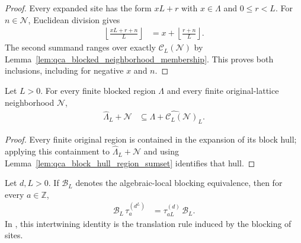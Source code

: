 \begin{proof}\leanok
    Every expanded site has the form $xL+r$ with $x\in\Lambda$ and $0\leq r<L$.
    For $n\in\mathcal N$, Euclidean division gives
    \begin{align}
        \left\lfloor\frac{xL+r+n}{L}\right\rfloor
         & =x+\left\lfloor\frac{r+n}{L}\right\rfloor.
    \end{align}
    The second summand ranges over exactly $\mathcal C_L(\mathcal N)$ by
    Lemma~\ref{lem:qca_blocked_neighborhood_membership}.  This proves both
    inclusions, including for negative $x$ and $n$.
\end{proof}

\begin{lemma}
    \label{lem:qca_region_sumset_expanded_region_subset}
    \leanok
    Let $L>0$.  For every finite blocked region $\Lambda$ and every finite
    original-lattice neighborhood $\mathcal N$,
    \begin{align}
        \widehat\Lambda_L+\mathcal N
         & \subseteq
        \widehat{\Lambda+\mathcal C_L(\mathcal N)}_L.
    \end{align}
\end{lemma}

\begin{proof}\leanok
    Every finite original region is contained in the expansion of its block
    hull; applying this containment to
    $\widehat\Lambda_L+\mathcal N$ and using
    Lemma~\ref{lem:qca_block_hull_region_sumset} identifies that hull.
\end{proof}

\begin{lemma}
    \label{lem:qca_algebraic_blocking_translation}
    \leanok
    Let $d,L>0$.  If $\mathcal B_L$ denotes the algebraic-local blocking
    equivalence, then for every $a\in\mathbb Z$,
    \begin{align}
        \mathcal B_L\,\tau^{(d^L)}_a
         & =\tau^{(d)}_{aL}\,\mathcal B_L.
    \end{align}
    In \cite[lines~2308 and 2313--2320]{Cirac2017MPU}, this intertwining identity is the translation rule induced by the blocking of
    sites.
\end{lemma}

